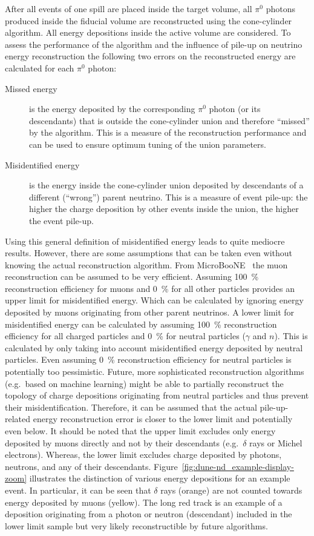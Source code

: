 \documentclass[a4paper]{article}
\begin{document}
After all events of one spill are placed inside the target volume, all $\pi^0$ photons produced inside the fiducial volume are reconstructed using the cone-cylinder algorithm.
All energy depositions inside the active volume are considered.
To assess the performance of the algorithm and the influence of pile-up on neutrino energy reconstruction the following two errors on the reconstructed energy are calculated for each $\pi^0$ photon:
\begin{description}
	\item[Missed energy] is the energy deposited by the corresponding $\pi^0$ photon (or its descendants) that is outside the cone-cylinder union and therefore ``missed'' by the algorithm.
	This is a measure of the reconstruction performance and can be used to ensure optimum tuning of the union parameters.
	\item[Misidentified energy] is the energy inside the cone-cylinder union deposited by descendants of a different (``wrong'') parent neutrino.
	This is a measure of event pile-up: the higher the charge deposition by other events inside the union, the higher the event pile-up.
\end{description}
Using this general definition of misidentified energy leads to quite mediocre results.
However, there are some assumptions that can be taken even without knowing the actual reconstruction algorithm.
From MicroBooNE~\cite{pandora} the muon reconstruction can be assumed to be very efficient.
Assuming \SI{100}{\percent} reconstruction efficiency for muons and \SI{0}{\percent} for all other particles provides an upper limit for misidentified energy.
Which can be calculated by ignoring energy deposited by muons originating from other parent neutrinos.
A lower limit for misidentified energy can be calculated by assuming \SI{100}{\percent} reconstruction efficiency for all charged particles and \SI{0}{\percent} for neutral particles ($\gamma$ and $n$).
This is calculated by only taking into account misidentified energy deposited by neutral particles.
Even assuming \SI{0}{\percent} reconstruction efficiency for neutral particles is potentially too pessimistic.
Future, more sophisticated reconstruction algorithms (e.g.\ based on machine learning) might be able to partially reconstruct the topology of charge depositions originating from neutral particles and thus prevent their misidentification.
Therefore, it can be assumed that the actual pile-up-related energy reconstruction error is closer to the lower limit and potentially even below.
It should be noted that the upper limit excludes only energy deposited by muons directly and not by their descendants (e.g.\ $\delta$ rays or Michel electrons).
Whereas, the lower limit excludes charge deposited by photons, neutrons, and any of their descendants.
Figure~\ref{fig:dune-nd_example-display-zoom} illustrates the distinction of various energy depositions for an example event.
In particular, it can be seen that $\delta$ rays (orange) are not counted towards energy deposited by muons (yellow).
The long red track is an example of a deposition originating from a photon or neutron (descendant) included in the lower limit sample but very likely reconstructible by future algorithms.
\end{document}
